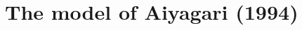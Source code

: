 \documentclass[12pt]{article}
\begin{document}
\small\normalsize%
\doublespace

\clearpage
\section*{The model of Aiyagari (1994)}

\end{document}
